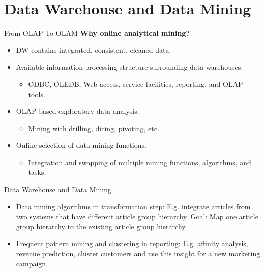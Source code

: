 \section{Data Warehouse and Data Mining}


\begin{frame}{From OLAP To OLAM\footnotemark[5]}
	\textbf{Why online analytical mining?}
	\begin{itemize}
		\item DW contains integrated, consistent, cleaned data.
		\item Available information-processing structure surrounding data warehouses.
		      \begin{itemize}
			      \item ODBC, OLEDB, Web access, service facilities, reporting, and OLAP tools.
		      \end{itemize}
		\item OLAP-based exploratory data analysis.
		      \begin{itemize}
			      \item Mining with drilling, dicing, pivoting, etc.
		      \end{itemize}
		\item Online selection of data-mining functions.
		      \begin{itemize}
			      \item Integration and swapping of multiple mining functions, algorithms, and tasks.
		      \end{itemize}
	\end{itemize}
\end{frame}


\begin{frame}{Data Warehouse and Data Mining}
	\vspace*{-1em}
	

	\begin{itemize}
		\item Data mining algorithms in transformation step: E.g. integrate articles from two systems that have different article group hierarchy. Goal: Map one article group hierarchy to the existing article group hierarchy.
		\item Frequent pattern mining and clustering in reporting: E.g. affinity
		      analysis, revenue prediction, cluster customers and use this insight for a
		      new marketing campaign.
	\end{itemize}
\end{frame}
